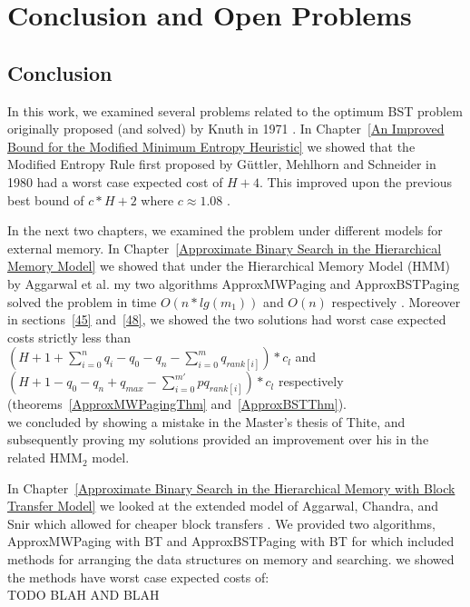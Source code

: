 \documentclass[letterpaper,12pt,titlepage,oneside,final]{book}
\theoremstyle{plain}
\begin{document}



\chapter{Conclusion and Open Problems} \label{Conclusion and Open Problems}

\section{Conclusion}

In this work, we examined several problems related to the optimum BST problem originally proposed (and solved) by Knuth in 1971 \cite{knuth1971optimum}. In Chapter~\ref{An Improved Bound for the Modified Minimum Entropy Heuristic} we showed that the Modified Entropy Rule first proposed by  G{\"u}ttler, Mehlhorn and Schneider in 1980 had a worst case expected cost of $H+4$. This improved upon the previous best bound of $c*H+2$ where $c \approx 1.08$ \cite{guttler1980binary}.

 In the next two chapters, we examined the problem under different models for external memory. In Chapter~\ref{Approximate Binary Search in the Hierarchical Memory Model} we showed that under the Hierarchical Memory Model (HMM) by Aggarwal et al. my two algorithms ApproxMWPaging and ApproxBSTPaging solved the problem in time $O(n*lg(m_1))$ and $O(n)$ respectively \cite{aggarwal1987model}. Moreover in sections~\ref{45} and~\ref{48}, we showed the two solutions had worst case expected costs strictly less than \\ $(H + 1 + \sum_{i=0}^n q_i - q_0 - q_n - \sum_{i=0}^m q_{rank[i]}) * c_l$ and \\
  $(H + 1 - q_0 - q_n + q_{max} - \sum_{i=0}^{m'} pq_{rank[i]})*c_l$ respectively (theorems~\ref{ApproxMWPagingThm} and~\ref{ApproxBSTThm}).\\
   we concluded by showing a mistake in the Master's thesis of Thite, and subsequently proving my solutions provided an improvement over his in the related HMM$_2$ model.
   
   In Chapter~\ref{Approximate Binary Search in the Hierarchical Memory with Block Transfer Model} we looked at the extended model of Aggarwal, Chandra, and Snir which allowed for cheaper block transfers \cite{aggarwal1987hierarchical}. We provided two algorithms, ApproxMWPaging with BT and ApproxBSTPaging with BT for which included methods for arranging the data structures on memory and searching. we showed the methods have worst case expected costs of: \\
   TODO BLAH AND BLAH 
\end{document}
